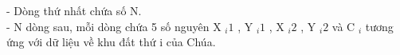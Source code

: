 - Dòng thứ nhất chứa số N.
\\- N dòng sau, mỗi dòng chứa 5 số nguyên X $_ i1 $ , Y $_ i1 $ , X $_ i2 $ , Y $_ i2 $ và C $_ i $ tương ứng với dữ liệu về khu đất thứ i của Chúa.